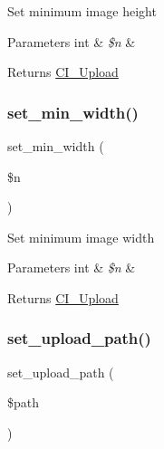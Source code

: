 Set minimum image height


\begin{DoxyParams}[1]{Parameters}
int & {\em \$n} & \\
\hline
\end{DoxyParams}
\begin{DoxyReturn}{Returns}
\mbox{\hyperlink{class_c_i___upload}{C\+I\+\_\+\+Upload}} 
\end{DoxyReturn}
\mbox{\label{class_c_i___upload_afe47751e024dc9bf07333060628e0fb4}} 
\subsubsection{\texorpdfstring{set\+\_\+min\+\_\+width()}{set\_min\_width()}}
{\footnotesize\ttfamily set\+\_\+min\+\_\+width (\begin{DoxyParamCaption}\item[{}]{\$n }\end{DoxyParamCaption})}

Set minimum image width


\begin{DoxyParams}[1]{Parameters}
int & {\em \$n} & \\
\hline
\end{DoxyParams}
\begin{DoxyReturn}{Returns}
\mbox{\hyperlink{class_c_i___upload}{C\+I\+\_\+\+Upload}} 
\end{DoxyReturn}
\mbox{\label{class_c_i___upload_ab2407f3a942d9b203f54e21194cf040d}} 
\subsubsection{\texorpdfstring{set\+\_\+upload\+\_\+path()}{set\_upload\_path()}}
{\footnotesize\ttfamily set\+\_\+upload\+\_\+path (\begin{DoxyParamCaption}\item[{}]{\$path }\end{DoxyParamCaption})}

